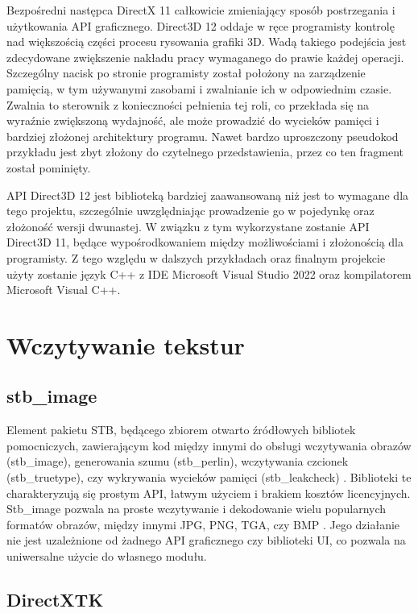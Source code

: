 Bezpośredni następca DirectX 11 całkowicie zmieniający sposób
postrzegania i użytkowania API graficznego. Direct3D 12 oddaje w ręce
programisty kontrolę nad większością części procesu rysowania grafiki
3D. Wadą takiego podejścia jest zdecydowane zwiększenie nakładu pracy
wymaganego do prawie każdej operacji. Szczególny nacisk po stronie
programisty został położony na zarządzenie pamięcią, w tym
używanymi zasobami i zwalnianie ich w odpowiednim czasie. Zwalnia to
sterownik z konieczności pełnienia tej roli, co przekłada się na
wyraźnie zwiększoną wydajność, ale może prowadzić do wycieków pamięci i
bardziej złożonej architektury programu. Nawet bardzo uproszczony pseudokod przykładu jest zbyt złożony do czytelnego przedstawienia, przez co ten fragment został pominięty.

API Direct3D 12 jest biblioteką bardziej zaawansowaną niż jest to
wymagane dla tego projektu, szczególnie uwzględniając prowadzenie go w
pojedynkę oraz złożoność wersji dwunastej. W związku z tym wykorzystane
zostanie API Direct3D 11, będące wypośrodkowaniem między możliwościami i złożonością dla programisty. Z tego względu w dalszych
przykładach oraz finalnym projekcie użyty zostanie język C++ z IDE
Microsoft Visual Studio 2022 oraz kompilatorem Microsoft Visual C++.

\section{Wczytywanie tekstur}

\subsection{stb\_image}

Element pakietu STB, będącego zbiorem otwarto źródłowych bibliotek
pomocniczych, zawierającym kod między innymi do obsługi wczytywania
obrazów (stb\_image), generowania szumu (stb\_perlin), wczytywania
czcionek (stb\_truetype), czy wykrywania wycieków pamięci
(stb\_leakcheck) \cite{github:stb:2024}. Biblioteki te charakteryzują się prostym API,
łatwym użyciem i brakiem kosztów licencyjnych. Stb\_image pozwala na proste wczytywanie i dekodowanie wielu popularnych
formatów obrazów, między innymi JPG, PNG, TGA, czy BMP \cite{github:stb:2024}. Jego
działanie nie jest uzależnione od żadnego API graficznego czy biblioteki
UI, co pozwala na uniwersalne użycie do własnego modułu. 

\subsection{DirectXTK}

